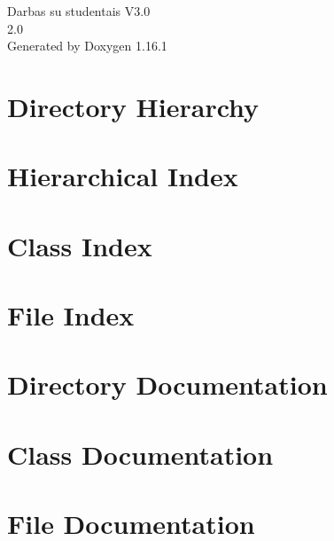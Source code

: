 \documentclass[twoside]{book}
\newcommand{\+}{\discretionary{\mbox{\scriptsize$\hookleftarrow$}}{}{}}
\newcommand{\clearemptydoublepage}{%
    \newpage{\pagestyle{empty}\cleardoublepage}%
  }
\begin{document}
  \raggedbottom
    \hypersetup{pageanchor=false,
                bookmarksnumbered=true,
                pdfencoding=unicode
               }
  \begin{titlepage}
  \vspace*{7cm}
  \begin{center}%
  {\Large Darbas su studentais V3.\+0}\\
  [1ex]\large 2.\+0 \\
  \vspace*{1cm}
  {\large Generated by Doxygen 1.16.1}\\
  \end{center}
  \end{titlepage}
  \clearemptydoublepage
  \tableofcontents
  \clearemptydoublepage
  \hypersetup{pageanchor=true}
\chapter{Directory Hierarchy}

\chapter{Hierarchical Index}

\chapter{Class Index}

\chapter{File Index}

\chapter{Directory Documentation}


\chapter{Class Documentation}




\chapter{File Documentation}













  \backmatter
  \newpage
  \clearemptydoublepage
  \printindex
\end{document}
